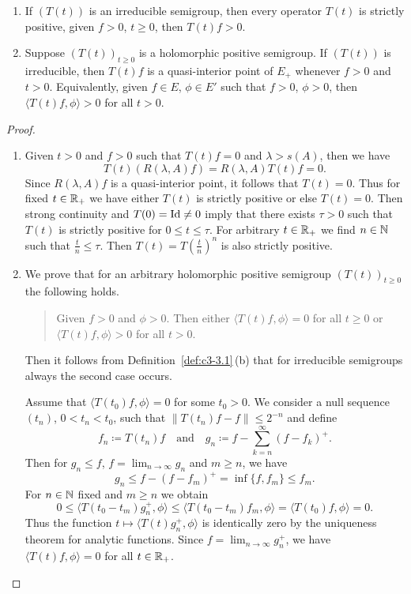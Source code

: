 \begin{theorem}\label{thm:c3-3.2}
	\begin{enumerate}[\upshape (i), wide, labelindent=.25em]
	\item
 	If\/ $(T(t))$ is an irreducible semigroup, 
    then every operator $T(t)$ is strictly positive, \ie 
	given $f > 0$, $t \geq 0$, then $T(t)f > 0$.
	\item 
	Suppose $(T(t))_{t\geq 0}$ is a holomorphic positive semigroup.%
	If\/ $(T(t))$ is irreducible, then $T(t)f$ is a quasi-interior point
    of\/ $E_{+}$ whenever $f > 0$ and $t > 0$.
	Equivalently, given $f \in E$, $\phi \in E'$ such that $f > 0$, $\phi > 0$, then $\langle T(t)f,\phi \rangle > 0$ for all $t > 0$. 
	\end{enumerate}
\end{theorem}
\begin{proof}
\begin{enumerate}[\upshape (i), wide, labelindent=.25em]
	\item
	Given $t > 0$ and $f > 0$ such that $T(t)f = 0$ and $\lambda > s(A)$, then we have 
\[
	T(t)(R(\lambda,A)f) = R(\lambda,A)T(t)f = 0 .
\]
%
Since $R(\lambda,A)f$ is a quasi-interior point, it follows that $T(t) = 0$.
Thus for fixed $t \in \mathbb{R} _{+}$ we have either $T(t)$ is strictly positive or else $T(t) = 0$.
Then strong continuity and $T(0) = \operatorname{Id} \neq 0$ imply that there exists $\tau > 0$ such that $T(t)$ is strictly positive for $0 \leq t \leq \tau$.
For arbitrary $t \in \mathbb{R} _{+}$ we find $n \in \mathbb{N}$ such that $\frac{t}{n} \leq \tau$.
Then $T(t) = T(\frac{t}{n})^{n}$ is also strictly positive.
	
\item
We prove that for an arbitrary holomorphic positive semigroup $(T(t))_{t\geq 0}$ the following holds.
\begin{quote}
Given $f > 0$ and $\phi > 0$.
Then either $\langle T(t)f,\phi \rangle = 0$ for all $t \geq 0$ or $\langle T(t)f,\phi \rangle > 0$ for all $t > 0$.
\end{quote}
Then it follows from Definition~\ref{def:c3-3.1}\,(b) that for irreducible semigroups always the second case occurs.

Assume that $\langle T(t_{0})f,\phi \rangle = 0$ for some $t_{0} > 0$.
We consider a null sequence $(t_{n})$, $0 < t_{n} < t_{0}$, such that $\|T(t_{n})f - f\| \leq 2^{-n}$ and define %
\[
	f_{n} \coloneq T(t_{n})f 
	\quad \text{and} \quad 
	g_{n} \coloneq f - \sum_{k=n}^{\infty}(f-f_{k})^{+}.
\]
%
Then for $g_{n} \leq f$, $f = \lim_{n\to\infty}g_{n}$ and $m \geq n$, we have 
\[
	g_{n} \leq f - (f-f_{m})^{+} = \inf\{f,f_{m}\} \leq f_{m} .
\]
%
For $n \in \mathbb{N}$ fixed and $m \geq n$ we obtain 
%
\[
		0 \leq \langle T(t_{0}-t_{m})g_{n}^{+},\phi \rangle \leq \langle T(t_{0}-t_{m})f_{m},\phi \rangle = \langle T(t_{0})f,\phi \rangle = 0 .
\]
%
Thus the function $t \mapsto \langle T(t)g_{n}^{+},\phi \rangle$ is identically zero by the uniqueness theorem for analytic functions.
Since $f = \lim_{n\to\infty}g_{n}^{+}$, we have $\langle T(t)f,\phi \rangle = 0$ for all $t \in \mathbb{R} _{+}$.
\qedhere
\end{enumerate}
\end{proof}

